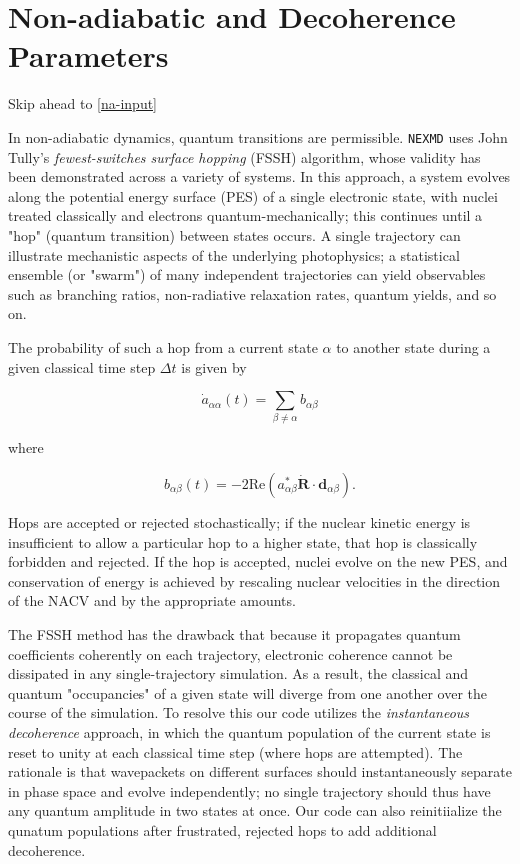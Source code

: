 \documentclass[12pt,letter,footinclude=true,headinclude=true,hyphens,oneside]{book} %
\begin{document}
    \section{Non-adiabatic and Decoherence Parameters}
    
    Skip ahead to \ref{na-input}
    
    In non-adiabatic dynamics, quantum transitions are permissible. \texttt{NEXMD} uses John Tully's \emph{fewest-switches surface hopping} (FSSH) algorithm, whose validity has been demonstrated across a variety of systems. In this approach, a system evolves along the potential energy surface (PES) of a single electronic state, with nuclei treated classically and electrons quantum-mechanically; this continues until a "hop" (quantum transition) between states occurs. A single trajectory can illustrate mechanistic aspects of the underlying photophysics; a statistical ensemble (or "swarm") of many independent trajectories can yield observables such as branching ratios, non-radiative relaxation rates, quantum yields, and so on.
    
    The probability of such a hop from a current state $\alpha$ to another state during a given classical time step $\Delta t$ is given by
    
    \begin{equation}
    \dot{a}_{\alpha \alpha}(t) = \sum_{\beta \neq \alpha} b_{\alpha \beta}
    \end{equation}
    
    where 
    
    \begin{equation}
    b_{\alpha \beta}(t) = -2 \textrm{Re} \left ( a_{\alpha \beta}^* \dot{\mathbf{R}} \cdot \mathbf{d}_{\alpha \beta} \right ). 
    \end{equation}
    
    Hops are accepted or rejected stochastically; if the nuclear kinetic energy is insufficient to allow a particular hop to a higher state, that hop is classically forbidden and rejected. If the hop is accepted, nuclei evolve on the new PES, and conservation of energy is achieved by rescaling nuclear velocities in the direction of the NACV and by the appropriate amounts.
    
    The FSSH method has the drawback that because it propagates quantum coefficients coherently on each trajectory, electronic coherence cannot be dissipated in any single-trajectory simulation. As a result, the classical and quantum "occupancies" of a given state will diverge from one another over the course of the simulation. To resolve this our code utilizes the \emph{instantaneous decoherence} approach, in which the quantum population of the current state is reset to unity at each classical time step (where hops are attempted). The rationale is that wavepackets on different surfaces should instantaneously separate in phase space and evolve independently; no single trajectory should thus have any quantum amplitude in two states at once. Our code can also reinitiialize the qunatum populations after frustrated, rejected hops to add additional decoherence.
    
\end{document}

